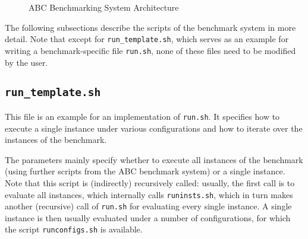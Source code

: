 \documentclass[a4paper]{article}
\newcommand{\abcs}{{ABC}}
\begin{document}
\begin{figure}
		\endpgfgraphicnamed
			
		\caption{\abcs{} Benchmarking System Architecture}
		\label{fig:architecture}
		\end{figure}

		The following subsections describe the scripts of the benchmark system
		in more detail.
		Note that except for {\tt run\_template.sh}, which serves as an example
		for writing a benchmark-specific file {\tt run.sh}, none of these files need
		to be modified by the user.

		\subsection{\tt run\_template.sh}
		\label{sec:architecture:run}
		
			This file is an example for an implementation of {\tt run.sh}.
		    It specifies how to execute a single instance under various configurations
		    and how to iterate over the instances of the benchmark.
		    
		    The parameters mainly specify whether to execute all instances
		    of the benchmark (using further scripts from the \abcs{} benchmark system)
		    or a single instance.
		    Note that this script is (indirectly) recursively called:
		    usually, the first call is to evaluate all instances, which internally
		    calls {\tt runinsts.sh}, which in turn makes another (recursive) call of {\tt run.sh}
		    for evaluating every single instance.
		    A single instance is then usually evaluated under a number of configurations,
		    for which the script {\tt runconfigs.sh} is available.
\end{document}
